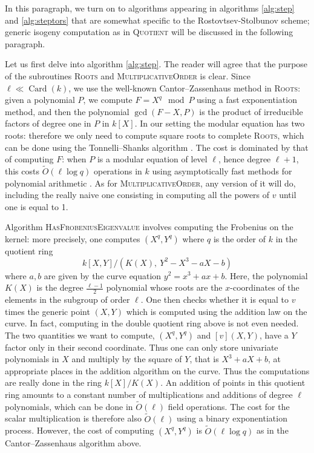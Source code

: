 \documentclass{article}
\newcommand{\softO}{\tilde{O}}
\newcommand{\algstyle}[1]{\textsc{#1}}
\renewcommand{\v}{\vspace{5mm}}
\theoremstyle{definition}
\DeclareMathOperator{\Card}{Card}
\begin{document}
In this paragraph, we turn on to algorithms appearing in algorithms \ref{alg:step}
and \ref{alg:steptors} that are somewhat specific to the Rostovtsev-Stolbunov
scheme; generic isogeny computation as in \algstyle{Quotient} will be discussed
in the following paragraph.
\v

Let us first delve into algorithm \ref{alg:step}.
The reader will agree that the purpose of the subroutines \algstyle{Roots}
and \algstyle{MultiplicativeOrder} is clear. Since $\ell\ll\Card(k)$,
we use the well-known Cantor--Zassenhaus method \cite{} in \algstyle{Roots}:
given a polynomial $P$,
we compute $F = X^q \mod P$ using a fast exponentiation method, and then the polynomial
$\gcd(F - X, P)$ is the product of irreducible factors of degree one in $P$
in $k[X]$. In our setting the modular equation has two roots: therefore we only need
to compute square roots to complete \algstyle{Roots}, which can be
done using the Tonnelli--Shanks algorithm \cite{}. The cost is dominated
by that of computing $F$: when $P$ is a modular equation
of level $\ell$, hence degree $\ell + 1$, this costs $\softO(\ell\log q)$ operations in $k$
using asymptotically fast methods for polynomial arithmetic \cite{}.
As for \algstyle{MultiplicativeOrder},
any version of it will do, including the really naive one consisting in computing
all the powers of $v$ until one is equal to 1.

Algorithm \algstyle{HasFrobeniusEigenvalue}
involves computing the Frobenius on the kernel: more precisely, one computes $(X^q, Y^q)$
where $q$ is the order of $k$ in the quotient ring
\[
k[X, Y]/(K(X),\ Y^2 - X^3 - aX - b)
\]
where $a, b$ are given by the curve equation $y^2 = x^3 + ax + b$. Here, the polynomial
$K(X)$ is the degree $\frac{\ell-1}{2}$ polynomial whose roots are the $x$-coordinates of the elements
in the subgroup of order $\ell$. One then checks whether it is equal to $v$ times the generic
point $(X, Y)$ which is computed using the addition law on the curve. In fact, computing
in the double quotient ring above is not even needed. The two quantities we want to compute,
$(X^q, Y^q)$ and $[v](X, Y)$, have a $Y$ factor only in their second coordinate. Thus one
can only store univariate polynomials in $X$ and multiply by the square of $Y$, that is
$X^3 + aX + b$, at appropriate places in the addition algorithm on the curve. Thus the
computations are really done in the ring $k[X]/K(X)$. An addition of points in this
quotient ring amounts to a constant number of multiplications and additions of degree $\ell$
polynomials, which can be done in $\softO(\ell)$ field operations.
The cost for the scalar multiplication is therefore also
$\softO(\ell)$ using a binary exponentiation process. However, the cost of computing
$(X^q, Y^q)$ is $\softO(\ell\log q)$ as in the Cantor--Zassenhaus algorithm above.
\end{document}
